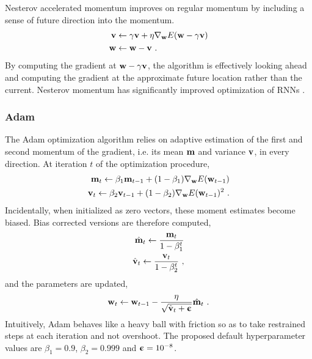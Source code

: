 Nesterov accelerated momentum \cite{Nesterov1983, Sutskever2013} improves on regular momentum by including a sense of future direction into the momentum. 
\begin{equation}
    \begin{aligned}
        {\mathbf{v}} & \leftarrow \gamma{\mathbf{v}} + \eta\nabla_{\mathbf{w}} E({\mathbf{w}}-\gamma{\mathbf{v}})\\
        {\mathbf{w}} & \leftarrow {\mathbf{w}} - {\mathbf{v}} \ .
    \end{aligned}
\end{equation}
By computing the gradient at ${\mathbf{w}}-\gamma{\mathbf{v}}$, the algorithm is effectively looking ahead and computing the gradient at the approximate future location rather than the current. Nesterov momentum has significantly improved optimization of \glspl{RNN} \cite{Bengio2013a}.



\subsubsection{Adam}
The Adam optimization algorithm \cite{Kingma2014} relies on adaptive estimation of the first and second momentum of the gradient, i.e. its mean ${\mathbf{m}}$ and variance ${\mathbf{v}}$, in every direction. At iteration $t$ of the optimization procedure,
\begin{subequations}
    \begin{align}
        {\mathbf{m}}_t \leftarrow \beta_1{\mathbf{m}}_{t-1} +{\left(1-\beta_1\right)}\nabla_{\mathbf{w}} E({\mathbf{w}}_{t-1}) \\
        {\mathbf{v}}_t \leftarrow \beta_2{\mathbf{v}}_{t-1} +{\left(1-\beta_2\right)}\nabla_{\mathbf{w}} E({\mathbf{w}}_{t-1})^2 \ .
    \end{align}
\end{subequations}
Incidentally, when initialized as zero vectors, these moment estimates become biased. Bias corrected versions are therefore computed,
\begin{subequations}
    \begin{align}
        \hat{{\mathbf{m}}}_t \leftarrow \frac{{\mathbf{m}}_t}{1-\beta_1^t}\\
        \hat{{\mathbf{v}}}_t \leftarrow \frac{{\mathbf{v}}_t}{1-\beta_2^t} \ ,
    \end{align}
\end{subequations}
and the parameters are updated,
\begin{equation}
    {\mathbf{w}}_{t} \leftarrow {\mathbf{w}}_{t-1} - \frac{\eta}{\sqrt{\hat{{\mathbf{v}}}_t+{\boldsymbol{\upepsilon}}}}\hat{{\mathbf{m}}}_t \ .
\end{equation}
Intuitively, Adam behaves like a heavy ball with friction \cite{Heusel2017} so as to take restrained steps at each iteration and not overshoot. The proposed default hyperparameter values are $\beta_1=0.9$, $\beta_2=0.999$ and ${\boldsymbol{\upepsilon}}=10^{-8}$.


